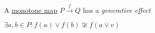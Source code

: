 
A \hyperref[D1.59]{monotone map} $P \xrightarrow{f} Q$ has a \emph{generative effect}

$\exists a,b \in P: f(a) \lor f(b) \not\cong f(a \lor v)$
